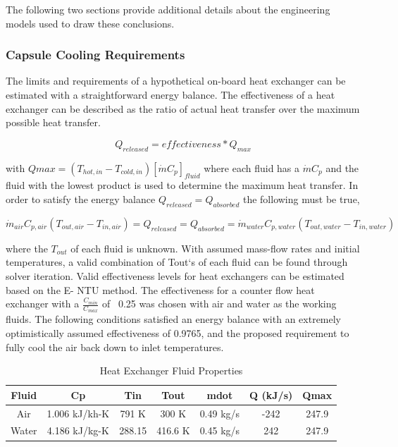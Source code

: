 \documentclass[heading.tex]{subfiles}
\begin{document}
The following two sections provide additional details about the engineering models used to draw these conclusions.

\subsubsection{Capsule Cooling Requirements}

The limits and requirements of a hypothetical on-board heat exchanger can be estimated with a straightforward energy balance. The
effectiveness of a heat exchanger can be described as the ratio of actual heat transfer over the maximum possible heat transfer.

\begin{equation*}
{Q}_{released}  = effectiveness * {Q}_{max}
\end{equation*}


with $Qmax=\left(T_{hot,in} - T_{cold,in}\right) [ \dot{m} C_{p} ]_{fluid}$ where each fluid has a $\dot{m} C_{p}$ and the fluid with the lowest
product is used to determine the maximum heat transfer. In order to satisfy the energy balance $Q_{released}=Q_{absorbed}$ the following must be true,

\begin{equation*}
\dot{m}_{air} C_{p, air} (T_{out, air} - T_{in, air}) = {Q}_{released} = {Q}_{absorbed}= \dot{m}_{water} C_{p,water} (T_{out, water} - T_{in, water})
\end{equation*}

where the $T_{out}$  of each fluid is unknown. With assumed mass-flow rates and initial temperatures, a valid combination of Tout‘s of
each fluid can be found through solver iteration. Valid effectiveness levels for heat exchangers can be estimated based on the E- NTU
method. The effectiveness for a counter flow heat exchanger with a $\frac{C_{min}}{C_{max}}$ of ~0.25 was chosen with air and water as the working fluids. 
The following conditions satisfied an energy balance with an extremely optimistically assumed effectiveness of 0.9765, and the proposed requirement to fully
cool the air back down to inlet temperatures.

\begin{table} [H]
\begin{tabular}{|c|c|c|c|c|c|c|}
\hline 
Fluid & Cp & Tin & Tout & mdot & Q (kJ/s) & Qmax \\ 
\hline 
Air & 1.006 kJ/kh-K & 791 K & 300 K & 0.49 kg/s & -242 & 247.9 \\ 
\hline 
Water & 4.186 kJ/kg-K & 288.15 & 416.6 K  & 0.45 kg/s & 242 & 247.9 \\ 
\hline 
\end{tabular} 
 \caption{Heat Exchanger Fluid Properties}
\end{table}
\end{document}
